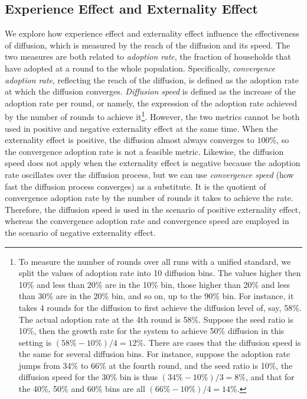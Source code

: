 \documentclass{bmcart}
\begin{document}
\subsection*{Experience Effect and Externality Effect}
We explore how experience effect and externality effect influence the effectiveness of diffusion, which is measured by the reach of the diffusion and its speed. The two measures are both related to \emph{adoption rate}, the fraction of households that have adopted at a round to the whole population. Specifically, \emph{convergence adoption rate}, reflecting the reach of the diffusion, is defined as the adoption rate at which the diffusion converges. \emph{Diffusion speed} is defined as the increase of the adoption rate per round, or namely, the expression of the adoption rate achieved by the number of rounds to achieve it\footnote{To measure the number of rounds over all runs with a unified standard, we split the values of adoption rate into 10 diffusion bins. The values higher then 10\% and less than 20\% are in the 10\% bin, those higher than 20\% and less than 30\% are in the 20\% bin, and so on, up to the 90\% bin. For instance, it takes 4 rounds for the diffusion to first achieve the diffusion level of, say, 58\%. The actual adoption rate at the 4th round is 58\%. Suppose the seed ratio is 10\%, then the growth rate for the system to achieve 50\% diffusion in this setting is $(58\%-10\%)/4=12\%$. There are cases that the diffusion speed is the same for several diffusion bins. For instance, suppose the adoption rate jumps from 34\% to 66\% at the fourth round, and the seed ratio is 10\%, the diffusion speed for the 30\% bin is thus $(34\%-10\%)/3=8\%$, and that for the 40\%, 50\% and 60\% bins are all $(66\%-10\%)/4=14\%$.}. However, the two metrics cannot be both used in positive and negative externality effect at the same time. When the externality effect is positive, the diffusion almost always converges to $100\%$, so the convergence adoption rate is not a feasible metric. Likewise, the diffusion speed does not apply when the externality effect is negative because the adoption rate oscillates over the diffusion process, but we can use \emph{convergence speed} (how fast the diffusion process converges) as a substitute. It is the quotient of convergence adoption rate by the number of rounds it takes to achieve the rate. Therefore, the diffusion speed is used in the scenario of positive externality effect, whereas the convergence adoption rate and convergence speed are employed in the scenario of negative externality effect.
\end{document}
